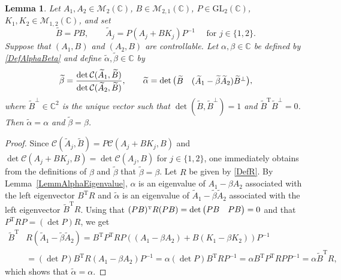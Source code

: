 \documentclass[JEP,XML,SOM,Unicode]{cedram}
\renewenvironment{bmatrix}{\bigl(\begin{matrix}}{\end{matrix}\bigr)}
\theoremstyle{plain}
\newtheorem{lemm}[theo]{Lemma}
\theoremstyle{definition}
\newcommand{\transp}{{\scriptscriptstyle\mathrm{T}}}
\begin{document}
\begin{lemm}
\label{LemmAlphaBetaInvariant}
Let $A_1, A_2 \in \mathcal M_2(\mathbb C)$, $B \in \mathcal M_{2, 1}(\mathbb C)$, $P \in \mathrm{GL}_2(\mathbb C)$, $K_1, K_2 \in \mathcal M_{1, 2}(\mathbb C)$, and set
\[
\widetilde B = P B, \qquad \widetilde A_j = P (A_j + B K_j) P^{-1} \quad \text{ for } j \in \{1, 2\}.
\]
Suppose that $(A_1, B)$ and $(A_2, B)$ are controllable. Let $\alpha, \beta \in \mathbb C$ be defined by \eqref{DefAlphaBeta} and define $\widetilde\alpha, \widetilde\beta \in \mathbb C$ by
\[
\widetilde\beta = \frac{\det \mathcal C(\widetilde A_1, \widetilde B)}{\det \mathcal C(\widetilde A_2, \widetilde B)}, \qquad \widetilde\alpha = \det \begin{bmatrix}\widetilde B & (\widetilde A_1 - \widetilde \beta \widetilde A_2) \widetilde B^\perp\end{bmatrix},
\]
where $\widetilde B^\perp \in \mathbb C^2$ is the unique vector such that $\det(\widetilde B, \widetilde B^\perp) = 1$ and $\widetilde B^\transp \widetilde B^\perp = 0$. Then $\widetilde\alpha = \alpha$ and $\widetilde\beta = \beta$.
\end{lemm}

\begin{proof}
Since $\mathcal C(\widetilde A_j, \widetilde B) = P \mathcal C(A_j + B K_j, B)$ and $\det \mathcal C(A_j + B K_j, B) = \det \mathcal C(A_j, B)$ for $j \in \{1, 2\}$, one immediately obtains from the definitions of $\beta$ and $\widetilde\beta$ that $\widetilde\beta = \beta$. Let $R$ be given by \eqref{DefR}. By Lemma~\ref{LemmAlphaEigenvalue}, $\alpha$ is an eigenvalue of $A_1 - \beta A_2$ associated with the left eigenvector $B^\transp R$ and $\widetilde\alpha$ is an eigenvalue of $\widetilde A_1 - \widetilde\beta \widetilde A_2$ associated with the left eigenvector $\widetilde B^\transp R$. Using that $(P B)^\transp R (P B) = \det\begin{bmatrix}PB & PB\\\end{bmatrix} = 0$ and that $P^\transp R P = (\det P) R$, we get
\begin{align*}
\widetilde B^\transp &R (\widetilde A_1 - \widetilde\beta \widetilde A_2)  = B^\transp P^\transp R P \left((A_1 - \beta A_2) + B(K_1 - \beta K_2)\right) P^{-1}\\
&= (\det P) B^\transp R (A_1 - \beta A_2) P^{-1}
= \alpha (\det P) B^\transp R P^{-1} = \alpha B^\transp P^\transp R P P^{-1} = \alpha \widetilde B^\transp R,
\end{align*}
which shows that $\widetilde\alpha = \alpha$.
\end{proof}
\end{document}
